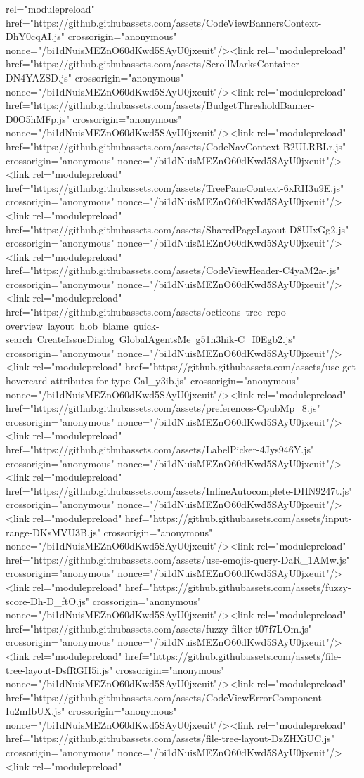rel="modulepreload" href="https://github.githubassets.com/assets/CodeViewBannersContext-DhY0cqAI.js" crossorigin="anonymous" nonce="/bi1dNuisMEZnO60dKwd5SAyU0jxeuit"/><link rel="modulepreload" href="https://github.githubassets.com/assets/ScrollMarksContainer-DN4YAZSD.js" crossorigin="anonymous" nonce="/bi1dNuisMEZnO60dKwd5SAyU0jxeuit"/><link rel="modulepreload" href="https://github.githubassets.com/assets/BudgetThresholdBanner-D0O5hMFp.js" crossorigin="anonymous" nonce="/bi1dNuisMEZnO60dKwd5SAyU0jxeuit"/><link rel="modulepreload" href="https://github.githubassets.com/assets/CodeNavContext-B2ULRBLr.js" crossorigin="anonymous" nonce="/bi1dNuisMEZnO60dKwd5SAyU0jxeuit"/><link rel="modulepreload" href="https://github.githubassets.com/assets/TreePaneContext-6xRH3u9E.js" crossorigin="anonymous" nonce="/bi1dNuisMEZnO60dKwd5SAyU0jxeuit"/><link rel="modulepreload" href="https://github.githubassets.com/assets/SharedPageLayout-D8UIxGg2.js" crossorigin="anonymous" nonce="/bi1dNuisMEZnO60dKwd5SAyU0jxeuit"/><link rel="modulepreload" href="https://github.githubassets.com/assets/CodeViewHeader-C4yaM2a-.js" crossorigin="anonymous" nonce="/bi1dNuisMEZnO60dKwd5SAyU0jxeuit"/><link rel="modulepreload" href="https://github.githubassets.com/assets/octicons~tree~repo-overview~layout~blob~blame~quick-search~CreateIssueDialog~GlobalAgentsMe~g51n3hik-C_I0Egb2.js" crossorigin="anonymous" nonce="/bi1dNuisMEZnO60dKwd5SAyU0jxeuit"/><link rel="modulepreload" href="https://github.githubassets.com/assets/use-get-hovercard-attributes-for-type-Cal_y3ib.js" crossorigin="anonymous" nonce="/bi1dNuisMEZnO60dKwd5SAyU0jxeuit"/><link rel="modulepreload" href="https://github.githubassets.com/assets/preferences-CpubMp_8.js" crossorigin="anonymous" nonce="/bi1dNuisMEZnO60dKwd5SAyU0jxeuit"/><link rel="modulepreload" href="https://github.githubassets.com/assets/LabelPicker-4Jys946Y.js" crossorigin="anonymous" nonce="/bi1dNuisMEZnO60dKwd5SAyU0jxeuit"/><link rel="modulepreload" href="https://github.githubassets.com/assets/InlineAutocomplete-DHN9247t.js" crossorigin="anonymous" nonce="/bi1dNuisMEZnO60dKwd5SAyU0jxeuit"/><link rel="modulepreload" href="https://github.githubassets.com/assets/input-range-DKsMVU3B.js" crossorigin="anonymous" nonce="/bi1dNuisMEZnO60dKwd5SAyU0jxeuit"/><link rel="modulepreload" href="https://github.githubassets.com/assets/use-emojis-query-DaR_1AMw.js" crossorigin="anonymous" nonce="/bi1dNuisMEZnO60dKwd5SAyU0jxeuit"/><link rel="modulepreload" href="https://github.githubassets.com/assets/fuzzy-score-Dh-D_ftO.js" crossorigin="anonymous" nonce="/bi1dNuisMEZnO60dKwd5SAyU0jxeuit"/><link rel="modulepreload" href="https://github.githubassets.com/assets/fuzzy-filter-t07f7LOm.js" crossorigin="anonymous" nonce="/bi1dNuisMEZnO60dKwd5SAyU0jxeuit"/><link rel="modulepreload" href="https://github.githubassets.com/assets/file-tree-layout-DsfRGH5i.js" crossorigin="anonymous" nonce="/bi1dNuisMEZnO60dKwd5SAyU0jxeuit"/><link rel="modulepreload" href="https://github.githubassets.com/assets/CodeViewErrorComponent-Iu2mIbUX.js" crossorigin="anonymous" nonce="/bi1dNuisMEZnO60dKwd5SAyU0jxeuit"/><link rel="modulepreload" href="https://github.githubassets.com/assets/file-tree-layout-DzZHXiUC.js" crossorigin="anonymous" nonce="/bi1dNuisMEZnO60dKwd5SAyU0jxeuit"/><link rel="modulepreload" 